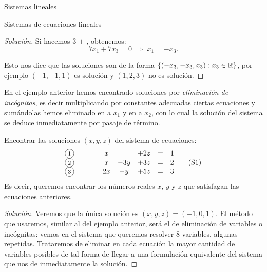 \begin{chapter}{Sistemas lineales}
\begin{section}{Sistemas de ecuaciones lineales}
\begin{proof}[Solución]
                Si  hacemos $3$ {\footnotesize{}} $+$ {\footnotesize{}}, obtenemos: 
                $$ 7x_1 + 7x_3 = 0 \;\Rightarrow\;  x_1  =  -x_3.$$
                
                Esto nos dice que las soluciones son de la forma $\{(-x_3,-x_3, x_3): x_3 \in \mathbb R \}$, por ejemplo $(-1,-1,1)$ es solución y $(1,2,3)$ no es solución.
            \end{proof}
            
                
            En  el ejemplo anterior hemos encontrado soluciones por \textit{eliminación de incógnitas},  es decir multiplicando por constantes adecuadas  ciertas ecuaciones y sumándolas hemos eliminado en  {\footnotesize{}} a $x_1$ y en  {\footnotesize{}} a $x_2$, con lo cual la solución del sistema se deduce inmediatamente por pasaje de término.   
            
            \begin{ejemplo}\label{ej-sist-2}
                    Encontrar las soluciones $(x,y,z)$ del sistema de ecuaciones:
                    \begin{equation*}
                    \begin{matrix}
                    \text{\footnotesize\circled{1}}&\qquad&x &  & +2z & =& 1 \\
                    \text{\footnotesize\circled{2}}&\qquad&x& -3y & +3z & =&2 \\
                    \text{\footnotesize\circled{3}}&\qquad&2x& -y & +5z & =&3
                    \end{matrix} \tag{S1}
                    \end{equation*}
                    Es decir, queremos encontrar los números reales $x$, $y$ y $z$ que satisfagan las ecuaciones anteriores.
                
            \end{ejemplo}
                
                \begin{proof}[Solución]
                    Veremos que la única solución es $(x,y,z)=(-1,0,1)$.  El  método que usaremos, similar al del ejemplo anterior,  será el de eliminación de variables o incógnitas: vemos  en el sistema que queremos resolver 8 variables, algunas repetidas. Trataremos de eliminar en cada ecuación la mayor cantidad de variables posibles de tal forma de llegar a una formulación equivalente del sistema que nos de inmediatamente la solución. 


\end{proof}
\end{section}
\end{chapter}
